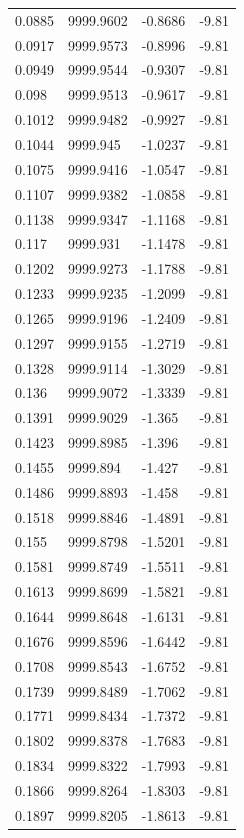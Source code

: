 \begin{table}[H]
\begin{tabular}{llll}
0.0885 & 9999.9602 & -0.8686 & -9.81 \\
0.0917 & 9999.9573 & -0.8996 & -9.81 \\
0.0949 & 9999.9544 & -0.9307 & -9.81 \\
0.098 & 9999.9513 & -0.9617 & -9.81 \\
0.1012 & 9999.9482 & -0.9927 & -9.81 \\
0.1044 & 9999.945 & -1.0237 & -9.81 \\
0.1075 & 9999.9416 & -1.0547 & -9.81 \\
0.1107 & 9999.9382 & -1.0858 & -9.81 \\
0.1138 & 9999.9347 & -1.1168 & -9.81 \\
0.117 & 9999.931 & -1.1478 & -9.81 \\
0.1202 & 9999.9273 & -1.1788 & -9.81 \\
0.1233 & 9999.9235 & -1.2099 & -9.81 \\
0.1265 & 9999.9196 & -1.2409 & -9.81 \\
0.1297 & 9999.9155 & -1.2719 & -9.81 \\
0.1328 & 9999.9114 & -1.3029 & -9.81 \\
0.136 & 9999.9072 & -1.3339 & -9.81 \\
0.1391 & 9999.9029 & -1.365 & -9.81 \\
0.1423 & 9999.8985 & -1.396 & -9.81 \\
0.1455 & 9999.894 & -1.427 & -9.81 \\
0.1486 & 9999.8893 & -1.458 & -9.81 \\
0.1518 & 9999.8846 & -1.4891 & -9.81 \\
0.155 & 9999.8798 & -1.5201 & -9.81 \\
0.1581 & 9999.8749 & -1.5511 & -9.81 \\
0.1613 & 9999.8699 & -1.5821 & -9.81 \\
0.1644 & 9999.8648 & -1.6131 & -9.81 \\
0.1676 & 9999.8596 & -1.6442 & -9.81 \\
0.1708 & 9999.8543 & -1.6752 & -9.81 \\
0.1739 & 9999.8489 & -1.7062 & -9.81 \\
0.1771 & 9999.8434 & -1.7372 & -9.81 \\
0.1802 & 9999.8378 & -1.7683 & -9.81 \\
0.1834 & 9999.8322 & -1.7993 & -9.81 \\
0.1866 & 9999.8264 & -1.8303 & -9.81 \\
0.1897 & 9999.8205 & -1.8613 & -9.81 \\

\end{tabular}
\end{table}
